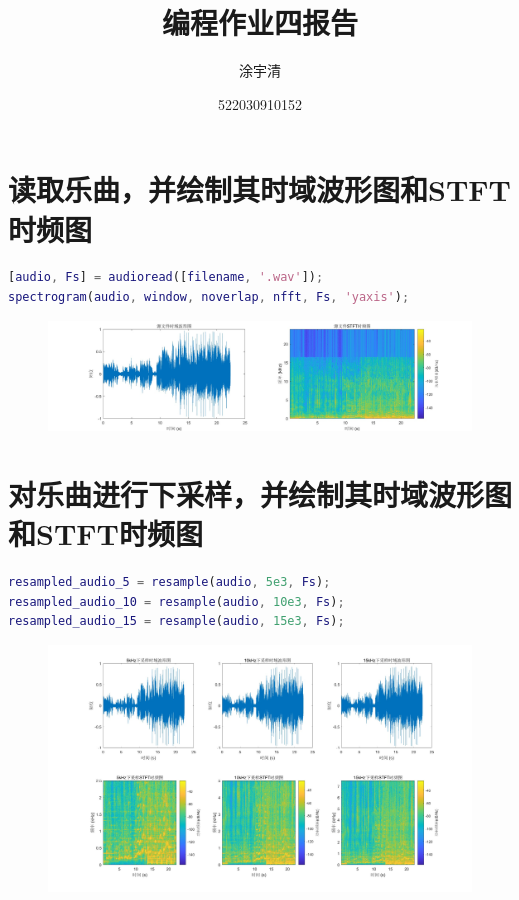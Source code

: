 \documentclass[UTF8,a4paper,11pt]{ctexart}
\title{\textbf{\Large{编程作业四报告}}}
\author{涂宇清}
\date{522030910152}
\begin{document}
 
\maketitle
\setcounter{page}{1}        %
 
 
\section{读取乐曲，并绘制其时域波形图和STFT时频图}

\begin{lstlisting}[language=matlab]
[audio, Fs] = audioread([filename, '.wav']);
spectrogram(audio, window, noverlap, nfft, Fs, 'yaxis');
\end{lstlisting}

\begin{figure}[H]   %
    \includegraphics[width=\linewidth]{PA4_1.jpg}
\end{figure}

\section{对乐曲进行下采样，并绘制其时域波形图和STFT时频图}
\begin{lstlisting}[language=matlab]
% 分别以5kHz、10kHz、15kHz的采样率对乐曲进行下采样
resampled_audio_5 = resample(audio, 5e3, Fs);
resampled_audio_10 = resample(audio, 10e3, Fs);
resampled_audio_15 = resample(audio, 15e3, Fs);
\end{lstlisting}

\begin{figure}[H]   %
    \includegraphics[width=\linewidth]{PA4_2.jpg}
\end{figure}
\end{document}
